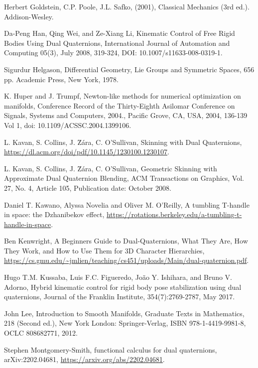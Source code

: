 \documentclass[reqno,12pt]{amsart}
\begin{document}
\begin{thebibliography}{99}
 Herbert Goldstein, C.P. Poole, J.L. Safko, (2001), Classical Mechanics (3rd ed.). Addison-Wesley.

 Da-Peng Han, Qing Wei, and Ze-Xiang Li, Kinematic Control of Free Rigid Bodies Using Dual Quaternions, International Journal of Automation and Computing
05(3), July 2008, 319-324, DOI: 10.1007/s11633-008-0319-1.

 Sigurdur Helgason, Differential Geometry, Lie Groups and Symmetric Spaces, 656 pp. Academic Press, New York, 1978.

 K. Huper and J. Trumpf, Newton-like methods for numerical optimization on manifolds, Conference Record of the Thirty-Eighth Asilomar Conference on Signals, Systems and Computers, 2004., Pacific Grove, CA, USA, 2004, 136-139 Vol 1, doi: 10.1109/ACSSC.2004.1399106.

 L. Kavan, S. Collins, J. \u Z\'ara, C. O'Sullivan, Skinning with Dual Quaternions, \url{https://dl.acm.org/doi/pdf/10.1145/1230100.1230107}.

 L. Kavan, S. Collins, J. \u Z\'ara, C. O'Sullivan, Geometric Skinning with Approximate Dual Quaternion Blending, ACM Transactions on Graphics, Vol. 27, No. 4, Article 105, Publication date: October 2008.

 Daniel T. Kawano, Alyssa Novelia and Oliver M. O'Reilly, A tumbling T-handle in space: the Dzhanibekov effect, \url{https://rotations.berkeley.edu/a-tumbling-t-handle-in-space}.

 Ben Kenwright, A Beginners Guide to Dual-Quaternions, What They Are, How They Work, and How to Use Them for 3D Character Hierarchies, \url{https://cs.gmu.edu/~jmlien/teaching/cs451/uploads/Main/dual-quaternion.pdf}.

 Hugo T.M. Kussaba, Luis F.C. Figueredo, Jo\~ao Y. Ishihara, and Bruno V. Adorno, Hybrid kinematic control for rigid body pose stabilization using dual quaternions, Journal of the Franklin Institute, 354(7):2769-2787, May 2017.

 John Lee, Introduction to Smooth Manifolds, Graduate Texts in Mathematics, 218 (Second ed.), New York London: Springer-Verlag, ISBN 978-1-4419-9981-8, OCLC 808682771, 2012.

 Stephen Montgomery-Smith, functional calculus for dual quaternions, arXiv:2202.04681, \url{https://arxiv.org/abs/2202.04681}.


\end{thebibliography}
\end{document}
